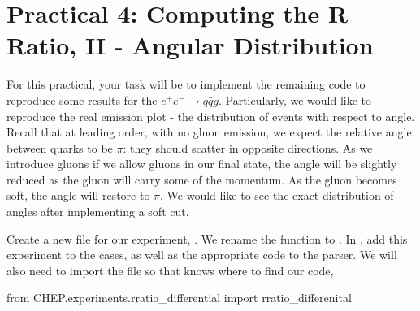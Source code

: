\section*{Practical 4: Computing the R Ratio, II - Angular Distribution }

For this practical, your task will be to implement the remaining code to reproduce some results for the $e^+e^-\to q\bar{q}g$. Particularly, we would like to reproduce the real emission plot - the distribution of events with respect to angle. Recall that at leading order, with no gluon emission, we expect the relative angle between quarks to be $\pi$: they should scatter in opposite directions. As we introduce gluons if we allow gluons in our final state, the angle will be slightly reduced as the gluon will carry some of the momentum. As the gluon becomes soft, the angle will restore to $\pi$. We would like to see the exact distribution of angles after implementing a soft cut. 



Create a new file for our experiment, . We rename the function to . In , add this experiment to the cases, as well as the appropriate code to the parser. We will also need to import the file so that  knows where to find our code,
\begin{codeenv}
    from CHEP.experiments.rratio_differential import rratio_differenital
\end{codeenv}

